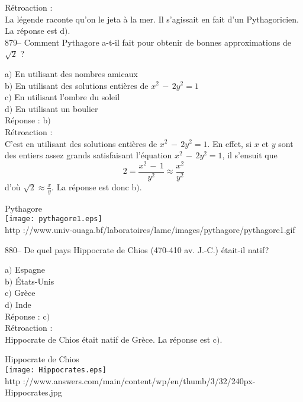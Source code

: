 ﻿\documentclass[letterpaper, 12pt]{article}
\begin{document}
R\'etroaction : \\
La l\'egende raconte qu'on le jeta \`a la mer. Il s'agissait en fait d'un
Pythagoricien. La r\'eponse est d$)$.\\

879-- Comment Pythagore a-t-il fait pour obtenir de bonnes
approximations de $\sqrt2$ ?

a$)$ En utilisant des nombres amicaux \\
b$)$ En utilisant des solutions enti\`eres de $x^2\,-\,2y^2=1$ \\
c$)$ En utilisant l'ombre du soleil \\
d$)$ En utilisant un boulier\\

R\'eponse : b$)$\\

R\'etroaction : \\
C'est en utilisant des solutions enti\`eres de $x^2\,-\,2y^2=1$. En
effet, si $x$ et $y$ sont des entiers assez grands satisfaisant
l'\'equation $x^2\,-\,2y^2=1$, il s'ensuit que
$$2=\displaystyle{\frac{x^2\,-\,1}{y^2}\approx\frac{x^2}{y^2}}$$
d'o\`u $\sqrt2\approx\frac xy$. La r\'eponse est donc b$)$.\\

        \begin{center}
        Pythagore\\
    \texttt{[image: pythagore1.eps]}\\
        {\footnotesize http
://www.univ-ouaga.bf/laboratoires/lame/images/pythagore/pythagore1.gif}
    \end{center}

880-- De quel pays Hippocrate de Chios (470-410 av. J.-C.)
\'etait-il natif?

a$)$ Espagne \\
b$)$ \'Etats-Unis \\
c$)$ Gr\`ece \\
d$)$ Inde\\

R\'eponse : c$)$\\

R\'etroaction : \\
Hippocrate de Chios \'etait natif de Gr\`ece. La r\'eponse est c$)$.\\

        \begin{center}
        Hippocrate de Chios\\
    \texttt{[image: Hippocrates.eps]}\\
        {\footnotesize http
://www.answers.com/main/content/wp/en/thumb/3/32/240px-Hippocrates.jpg}
    \end{center}
\end{document}

